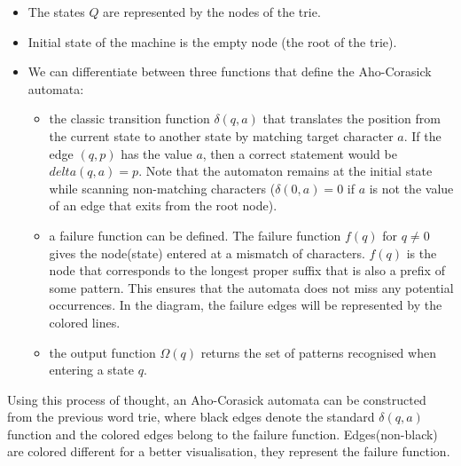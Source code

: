 \documentclass[letterpaper]{article}
\begin{document}
\begin{itemize}
    \item The states $Q$ are represented by the nodes of the trie.
    \item Initial state of the machine is the empty node (the root of the trie).
    \item We can differentiate between three functions that define the Aho-Corasick automata:
    \begin{itemize}
        \item the classic transition function $\delta (q, a)$ that translates the position from the current state to another state by matching target character $a$. If the edge $(q, p)$ has the value $a$, then a correct statement would be $delta(q, a) = p$. Note that the automaton remains at the initial state while scanning non-matching characters ($\delta(0,a) = 0$ if $a$ is not the value of an edge that exits from the root node).

        \item a failure function can be defined. The failure function $f(q)$ for $q \neq 0$ gives the node(state) entered at a mismatch of characters. $f(q)$ is the node that corresponds to the longest proper suffix that is also a prefix of some pattern. This ensures that the automata does not miss any potential occurrences. In the diagram, the failure edges will be represented by the colored lines.

        \item the output function $\Omega(q)$ returns the set of patterns recognised when entering a state $q$.
    \end{itemize}
\end{itemize}

Using this process of thought, an Aho-Corasick automata can be constructed from the previous word trie, where black edges denote the standard $\delta(q,a)$ function and the colored edges belong to the failure function. Edges(non-black) are colored different for a better visualisation, they represent the failure function.
\end{document}

